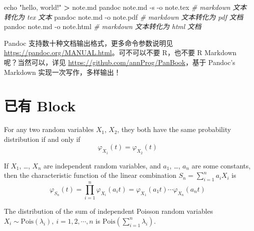 \documentclass[
  lang=cn,
  11pt,
  scheme=chinese,
  chinesefont=nofont,
  citestyle=gb7714-2015,
  bibstyle=gb7714-2015]{elegantbook}
\newenvironment{Shaded}{\begin{snugshade}}{\end{snugshade}}
\newcommand{\BuiltInTok}[1]{#1}
\newcommand{\CommentTok}[1]{\textcolor[rgb]{0.56,0.35,0.01}{\textit{#1}}}
\newcommand{\ExtensionTok}[1]{#1}
\newcommand{\NormalTok}[1]{#1}
\newcommand{\OperatorTok}[1]{\textcolor[rgb]{0.81,0.36,0.00}{\textbf{#1}}}
\newcommand{\StringTok}[1]{\textcolor[rgb]{0.31,0.60,0.02}{#1}}
\begin{document}
\begin{Shaded}
\begin{Highlighting}[]
\BuiltInTok{echo} \StringTok{"hello, world!"} \OperatorTok{\textgreater{}}\NormalTok{ note.md}
\ExtensionTok{pandoc}\NormalTok{ note.md {-}s {-}o note.tex }\CommentTok{\# markdown 文本转化为 tex 文本}
\ExtensionTok{pandoc}\NormalTok{ note.md {-}o note.pdf    }\CommentTok{\# markdown 文本转化为 pdf 文档}
\ExtensionTok{pandoc}\NormalTok{ note.md {-}o note.html   }\CommentTok{\# markdown 文本转化为 html 文档}
\end{Highlighting}
\end{Shaded}

Pandoc 支持数十种文档输出格式，更多命令参数说明见 \url{https://pandoc.org/MANUAL.html}。可不可以不要 R，也不要 R Markdown 呢？当然可以，详见 \url{https://github.com/annProg/PanBook}，基于 Pandoc's Markdown 实现一次写作，多样输出！

\hypertarget{theorem-block}{%
\section{已有 Block}\label{theorem-block}}

\begin{lemma}{}{}
\protect\hypertarget{lem:chf-pdf}{}{\label{lem:chf-pdf} }For any two random variables \(X_1\), \(X_2\), they both have the same probability distribution if and only if \[\varphi _{X_1}(t)=\varphi _{X_2}(t)\] \end{lemma}

\begin{theorem}{}{}
\protect\hypertarget{thm:chf-sum}{}{\label{thm:chf-sum} }If \(X_1\), \ldots, \(X_n\) are independent random variables, and \(a_1\), \ldots, \(a_n\) are some constants, then the characteristic function of the linear combination \(S_n=\sum_{i=1}^na_iX_i\) is \[\varphi _{S_{n}}(t)=\prod_{i=1}^n\varphi _{X_i}(a_{i}t)=\varphi _{X_{1}}(a_{1}t)\cdots \varphi _{X_{n}}(a_{n}t)\] \end{theorem}

\begin{proposition}{}{}
\protect\hypertarget{prp:unnamed-chunk-5}{}{\label{prp:unnamed-chunk-5} }The distribution of the sum of independent Poisson random variables \(X_i \sim \mathrm{Pois}(\lambda_i),\: i=1,2,\cdots,n\) is \(\mathrm{Pois}(\sum_{i=1}^n\lambda_i)\). \end{proposition}
\end{document}
